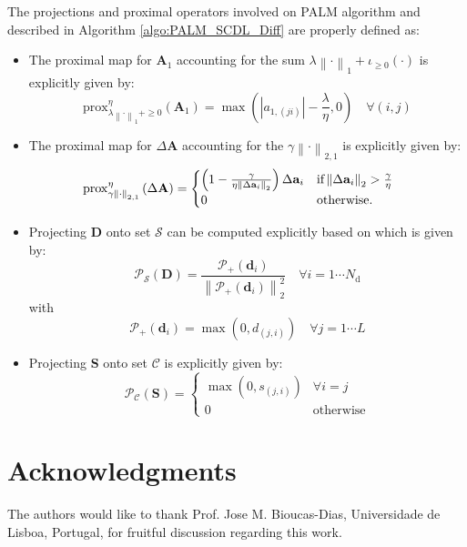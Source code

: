 \documentclass[review]{elsarticle}
\newcommand{\Ndim}{L}
\newcommand{\Natom}{N_{\mathrm{d}}}
\begin{document}
\begin{appendix}
The projections and proximal operators involved on PALM algorithm \citep{bolte_proximal_2014} and described in Algorithm \ref{algo:PALM_SCDL_Diff} are properly defined as:
%
\begin{itemize}
\item The proximal map for $\mathbf{A}_{1}$ accounting for the sum $\lambda\left\|\cdot\right\|_1 + \iota_{\geq0}(\cdot)$ is explicitly given by:
%
\begin{equation}
\mathrm{prox}^{\eta}_{\lambda\left\|\cdot\right\|_1 + \geq0}\left(\mathbf{A}_{1}\right) =   \max\left(|a_{1,{(ji)}}|-\frac{\lambda}{\eta},0\right) \quad \forall (i,j)
\end{equation}
%
\item The proximal map for $\Delta\mathbf{A}$ accounting for the $\gamma\left\|\cdot\right\|_{2,1}$ is explicitly given by:
%
\begin{equation}
\hspace{-0.5cm}\mathrm{prox}^{\eta}_{\gamma\left\|\cdot\right\|_{2,1}}\left(\Delta\mathbf{A}\right) =  \begin{cases} \left(1 - \frac{\gamma}{\eta\left\|\Delta\mathbf{a}_i\right\|_{2}}\right)\Delta\mathbf{a}_i & \text{if} \left\|\Delta\mathbf{a}_i\right\|_{2}>\frac{\gamma}{\eta}\\
				0 & \text{otherwise.}
\end{cases}
\end{equation}
%
\item Projecting $\mathbf{D}$ onto set $\mathcal{S}$ can be computed explicitly based on \citet{thouvenin_modeling_2017,bolte_proximal_2014} which is given by:
%
\begin{equation}
\mathcal{P}_{\mathcal{S}}\left(\mathbf{D}\right) = \frac{\mathcal{P}_{+}(\mathbf{d}_{i})}{\left\|\mathcal{P}_{+}(\mathbf{d}_{i})\right\|^2_2} \quad \forall i = 1 \cdots \Natom
\end{equation}
%
with
%
\begin{equation}
\mathcal{P}_{\mathcal{+}}\left(\mathbf{d}_{i}\right) = \max\left(0,d_{(j,i)}\right) \quad \forall j = 1 \cdots \Ndim
\end{equation}
%
\item Projecting $\mathbf{S}$ onto set $\mathcal{C}$ is explicitly given by:
%
\begin{equation}
\mathcal{P}_{\mathcal{C}}\left(\mathbf{S}\right) =  \begin{cases} \max\left(0,s_{(j,i)}\right) & \forall i=j \\
0 & \text{otherwise}
\end{cases}
\end{equation}
%
\end{itemize}
%
\end{appendix}
\section*{Acknowledgments}
The authors would like to thank Prof. Jose M. Bioucas-Dias, Universidade de Lisboa, Portugal, for fruitful discussion regarding this work.




\end{document}
